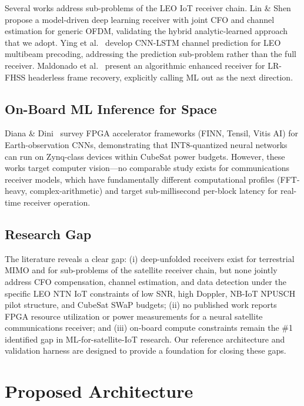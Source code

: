 \documentclass{article}
\begin{document}
Several works address sub-problems of the LEO IoT receiver chain. Lin \& Shen~\cite{lin2024hybrid} propose a model-driven deep learning receiver with joint CFO and channel estimation for generic OFDM, validating the hybrid analytic-learned approach that we adopt. Ying et al.~\cite{ying2024cnn} develop CNN-LSTM channel prediction for LEO multibeam precoding, addressing the prediction sub-problem rather than the full receiver. Maldonado et al.~\cite{maldonado2025lrfhss} present an algorithmic enhanced receiver for LR-FHSS headerless frame recovery, explicitly calling ML out as the next direction.

\subsection{On-Board ML Inference for Space}

Diana \& Dini~\cite{diana2024onboard} survey FPGA accelerator frameworks (FINN, Tensil, Vitis AI) for Earth-observation CNNs, demonstrating that INT8-quantized neural networks can run on Zynq-class devices within CubeSat power budgets. However, these works target computer vision---no comparable study exists for communications receiver models, which have fundamentally different computational profiles (FFT-heavy, complex-arithmetic) and target sub-millisecond per-block latency for real-time receiver operation.

\subsection{Research Gap}

The literature reveals a clear gap: (i) deep-unfolded receivers exist for terrestrial MIMO and for sub-problems of the satellite receiver chain, but none jointly address CFO compensation, channel estimation, and data detection under the specific LEO NTN IoT constraints of low SNR, high Doppler, NB-IoT NPUSCH pilot structure, and CubeSat SWaP budgets; (ii) no published work reports FPGA resource utilization or power measurements for a neural satellite communications receiver; and (iii) on-board compute constraints remain the \#1 identified gap in ML-for-satellite-IoT research. Our reference architecture and validation harness are designed to provide a foundation for closing these gaps.

\section{Proposed Architecture}
\label{sec:method}
\end{document}
